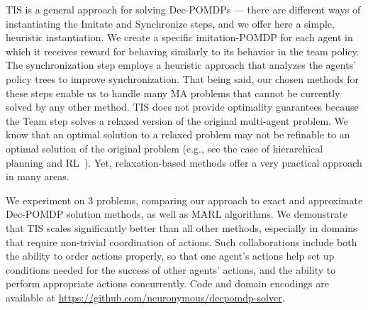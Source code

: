 \documentclass[runningheads]{llncs}
\begin{document}
TIS is a general approach for solving Dec-POMDPs --- there are
different ways of instantiating the Imitate and Synchronize steps, and we offer here
a simple, heuristic instantiation. We create a specific imitation-POMDP for each agent in which it receives reward for behaving similarly to its behavior in the team policy. The synchronization step employs a heuristic approach that analyzes the agents' policy trees to improve synchronization.
That being said, our chosen methods for these steps enable us to handle many MA problems that cannot be currently solved by any other method.
TIS does not provide optimality guarantees because
the Team step solves a relaxed version of the original multi-agent problem. We know that an optimal solution to a relaxed problem may not be refinable to an optimal solution of the original problem (e.g., see the case of hierarchical planning and RL~\cite{MAXQ}). Yet,
relaxation-based methods offer a very practical approach in many areas.


We experiment on 3 problems, comparing our approach to exact and approximate Dec-POMDP solution methods, as well as MARL algorithms. 
We demonstrate that TIS scales significantly better than all other methods, especially in domains that require non-trivial coordination of actions. Such collaborations include both the ability to order actions properly, so that one agent's actions help set up conditions needed for the success of other agents' actions, and the ability to perform appropriate actions concurrently.  Code and domain encodings are available at \url{https://github.com/neuronymous/decpomdp-solver}.
\end{document}
